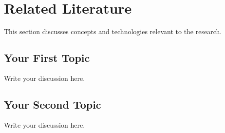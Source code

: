 \section{Related Literature}
\label{sec:related-literature}

This section discusses concepts and technologies relevant
to the research.

\subsection{Your First Topic}

Write your discussion here.

\subsection{Your Second Topic}

Write your discussion here.
